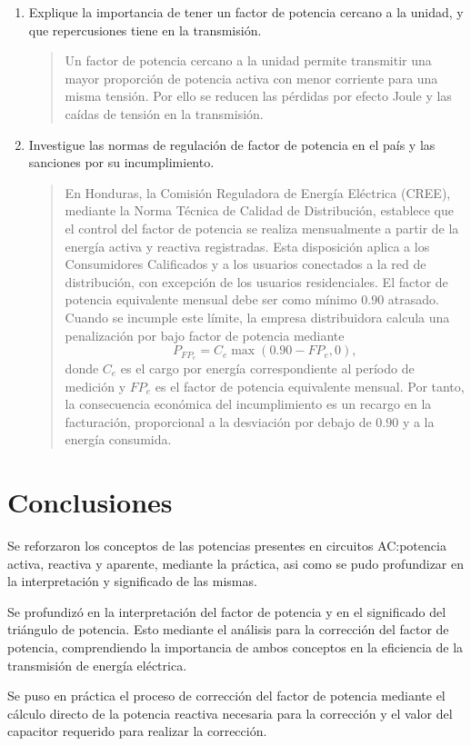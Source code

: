\documentclass[12pt,a4paper]{article}
\begin{document}
\begin{enumerate}
    \item Explique la importancia de tener un factor de potencia cercano a la unidad, y que repercusiones tiene en la transmisión.
    
    \begin{quote}
        Un factor de potencia cercano a la unidad permite transmitir una mayor proporción de potencia activa con menor corriente para una misma tensión. Por ello se reducen las pérdidas por efecto Joule y las caídas de tensión en la transmisión.
    \end{quote}

    \item Investigue las normas de regulación de factor de potencia en el país y las sanciones por su incumplimiento.
    
    \begin{quote}
        En Honduras, la Comisión Reguladora de Energía Eléctrica (CREE), mediante la Norma Técnica de Calidad de Distribución, establece que el control del factor de potencia se realiza mensualmente a partir de la energía activa y reactiva registradas. Esta disposición aplica a los Consumidores Calificados y a los usuarios conectados a la red de distribución, con excepción de los usuarios residenciales. El factor de potencia equivalente mensual debe ser como mínimo $0.90$ atrasado. Cuando se incumple este límite, la empresa distribuidora calcula una penalización por bajo factor de potencia mediante
        \[
            P_{FP_e}=C_e\max(0.90-FP_e,0),
        \]
        donde $C_e$ es el cargo por energía correspondiente al período de medición y $FP_e$ es el factor de potencia equivalente mensual. Por tanto, la consecuencia económica del incumplimiento es un recargo en la facturación, proporcional a la desviación por debajo de $0.90$ y a la energía consumida.
    \end{quote}
    
\end{enumerate}

\section{Conclusiones}
\begin{itemsinforme}
    \item Se reforzaron los conceptos de las potencias presentes en circuitos AC:\@ potencia activa, reactiva y aparente, mediante la práctica, asi como se pudo profundizar en la interpretación y significado de las mismas.
    \item Se profundizó en la interpretación del factor de potencia y en el significado del triángulo de potencia. Esto mediante el análisis para la corrección del factor de potencia, comprendiendo la importancia de ambos conceptos en la eficiencia de la transmisión de energía eléctrica.
    \item Se puso en práctica el proceso de corrección del factor de potencia mediante el cálculo directo de la potencia reactiva necesaria para la corrección y el valor del capacitor requerido para realizar la corrección.
\end{itemsinforme}
\end{document}
